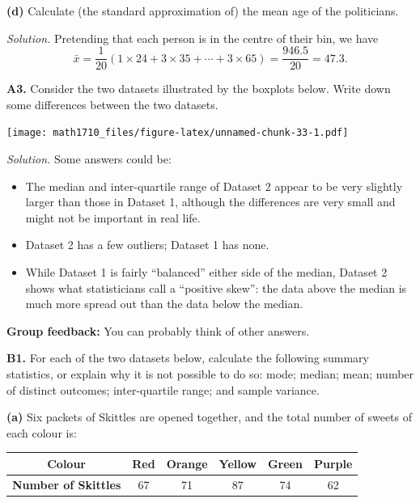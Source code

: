 \documentclass[
  a4paper,
]{book}
\providecommand{\tightlist}{%
  \setlength{\itemsep}{0pt}\setlength{\parskip}{0pt}}
\theoremstyle{definition}
\theoremstyle{definition}
\theoremstyle{definition}
\theoremstyle{definition}
\theoremstyle{remark}
\begin{document}
\textbf{(d)} Calculate (the standard approximation of) the mean age of the politicians.

\begin{myanswers}
\emph{Solution.} Pretending that each person is in the centre of their bin, we have
\[ \bar x = \frac{1}{20} (1\times24 + 3\times 35 + \cdots + 3 \times 65) = \frac{946.5}{20} = 47.3 . \]

\end{myanswers}

\textbf{A3.} Consider the two datasets illustrated by the boxplots below. Write down some differences between the two datasets.

\texttt{[image: math1710\_files/figure-latex/unnamed-chunk-33-1.pdf]}

\begin{myanswers}
\emph{Solution.} Some answers could be:

\begin{itemize}
\tightlist
\item
  The median and inter-quartile range of Dataset 2 appear to be very slightly larger than those in Dataset 1, although the differences are very small and might not be important in real life.
\item
  Dataset 2 has a few outliers; Dataset 1 has none.
\item
  While Dataset 1 is fairly ``balanced'' either side of the median, Dataset 2 shows what statisticians call a ``positive skew'': the data above the median is much more spread out than the data below the median.
\end{itemize}

\textbf{Group feedback:}
You can probably think of other answers.

\end{myanswers}

\textbf{B1.} For each of the two datasets below, calculate the following summary statistics, or explain why it is not possible to do so: mode; median; mean; number of distinct outcomes; inter-quartile range; and sample variance.

\textbf{(a)} Six packets of Skittles are opened together, and the total number of sweets of each colour is:

\begin{longtable}[]{@{}cccccc@{}}
\toprule()
\textbf{Colour} & Red & Orange & Yellow & Green & Purple \\
\midrule()
\endhead
\textbf{Number of Skittles} & 67 & 71 & 87 & 74 & 62 \\
\bottomrule()
\end{longtable}
\end{document}
